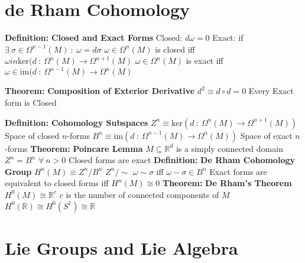 \documentclass[14pt]{extarticle}
\def\Definition{{\color{blue} \textbf{Definition:} }}
\def\Theorem{{\color{red} \textbf{Theorem:} }}
\begin{document}
\begin{outline}
	\section*{de Rham Cohomology}
		\1	\Definition \textbf{Closed and Exact Forms}
			\2	Closed: $d\omega = 0$
			\2	Exact: if $\exists~\sigma \in \Omega^{n-1}(M)~:~\omega = d\sigma$
			\2	$\omega \in \Omega^n(M)$ is closed iff $\omega in \text{ker}(d~:~\Omega^n(M) \rightarrow \Omega^{n+1}(M)$
			\2	$\omega \in \Omega^n(M)$ is exact iff $\omega \in \text{im}(d~:~\Omega^{n-1}(M) \rightarrow \Omega^n(M)$

		\1	\Theorem \textbf{Composition of Exterior Derivative}
			\2	$d^2 \equiv d \circ d = 0$
			\2	Every Exact form is Closed
		
		\1	\Definition \textbf{Cohomology Subspaces}
			\2	$Z^n \equiv \text{ker}(d~:~\Omega^n(M) \rightarrow \Omega^{n+1}(M))$
				\3	Space of closed $n$-forms
			\2	$B^n \equiv \text{im}(d~:~\Omega^{n-1}(M) \rightarrow \Omega^n(M))$
				\3	Space of exact $n$-forms
		\1	\Theorem \textbf{Poincare Lemma}
			\2	$M \subseteq \mathbb{R}^d$ is a simply connected domain
			\2	$Z^n = B^n$ $\forall~n > 0$
			\2	Closed forms are exact
		\1	\Definition \textbf{De Rham Cohomology Group}
			\2	$H^n(M) \equiv Z^n / B^n$
      \2	$Z^n / \sim$
				\3	$\omega \sim \sigma$ iff $\omega - \sigma \in B^n$
			\2	Exact forms are equivalent to closed forms iff
					$H^n(M) \cong 0$
		\1	\Theorem \textbf{De Rham's Theorem}
			\2	$H^0(M) \cong \mathbb{R}^c$
			\2	$c$ is the number of connected components of $M$
			\2	$H^0(\mathbb{R}) \cong H^0(S^1) \cong \mathbb{R}$

	\section*{Lie Groups and Lie Algebra}
	\end{outline}
\end{document}
